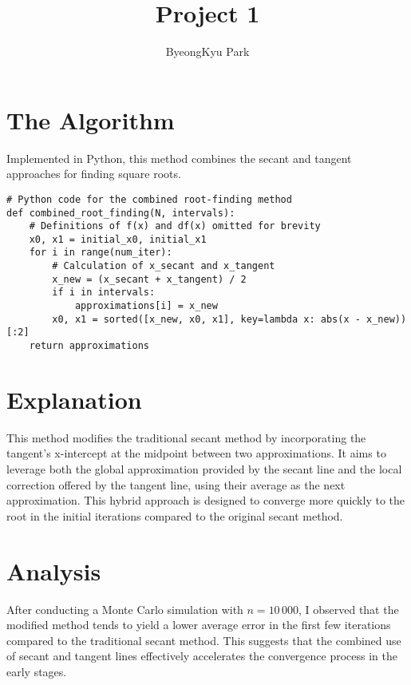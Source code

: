 \documentclass[10pt]{article}
\begin{document}
	
\title{Project 1}
\date{}
\author{ByeongKyu Park}

\maketitle

\section*{The Algorithm}

Implemented in Python, this method combines the secant and tangent approaches for finding square roots.


\begin{Verbatim}
# Python code for the combined root-finding method
def combined_root_finding(N, intervals):
    # Definitions of f(x) and df(x) omitted for brevity
    x0, x1 = initial_x0, initial_x1
    for i in range(num_iter):
        # Calculation of x_secant and x_tangent
        x_new = (x_secant + x_tangent) / 2
        if i in intervals:
            approximations[i] = x_new
        x0, x1 = sorted([x_new, x0, x1], key=lambda x: abs(x - x_new))[:2]
    return approximations
\end{Verbatim}

\section*{Explanation}

This method modifies the traditional secant method by incorporating the tangent's x-intercept at the midpoint between two approximations. It aims to leverage both the global approximation provided by the secant line and the local correction offered by the tangent line, using their average as the next approximation. This hybrid approach is designed to converge more quickly to the root in the initial iterations compared to the original secant method.

\section*{Analysis}

After conducting a Monte Carlo simulation with \(n = 10\,000\), I observed that the modified method tends to yield a lower average error in the first few iterations compared to the traditional secant method. This suggests that the combined use of secant and tangent lines effectively accelerates the convergence process in the early stages.
\end{document}
